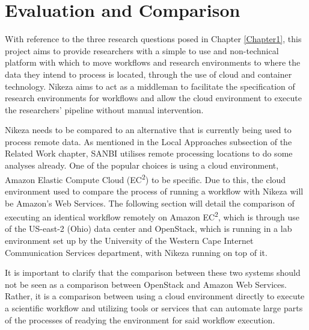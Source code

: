 
\chapter{Evaluation and Comparison} %

\label{Chapter4} %




With reference to the three research questions posed in Chapter \ref{Chapter1}, this project aims to provide researchers with a simple to use and non-technical platform with which to move workflows and research environments to where the data they intend to process is located, through the use of cloud and container technology. Nikeza aims to act as a middleman to facilitate the specification of research environments for workflows and allow the cloud environment to execute the researchers' pipeline without manual intervention. 

Nikeza needs to be compared to an alternative that is currently being used to process remote data. As mentioned in the Local Approaches subsection of the Related Work chapter, SANBI utilises remote processing locations to do some analyses already. One of the popular choices is using a cloud environment, Amazon Elastic Compute Cloud (EC\textsuperscript{2}) to be specific. Due to this, the cloud environment used to compare the process of running a workflow with Nikeza will be Amazon's Web Services. The following section will detail the comparison of executing an identical workflow remotely on Amazon EC\textsuperscript{2}, which is through use of the US-east-2 (Ohio) data center and OpenStack, which is running in a lab environment set up by the University of the Western Cape Internet Communication Services department, with Nikeza running on top of it.

It is important to clarify that the comparison between these two systems should not be seen as a comparison between OpenStack and Amazon Web Services. Rather, it is a comparison between using a cloud environment directly to execute a scientific workflow and utilizing tools or services that can automate large parts of the processes of readying the environment for said workflow execution.

